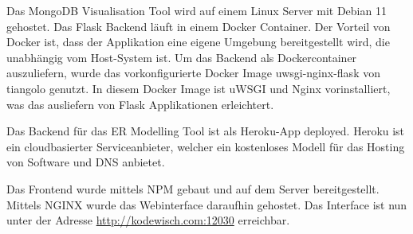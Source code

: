 \iffalse
Aufgabe des Kapitels Inbetriebnahme ist es, die Überführung der in 
Kapitel \ref{cha:implementierung} entwickelte Lösung in das betriebliche 
Umfeld aufzuzeigen. Dabei wird beispielsweise die Inbetriebnahme eines 
Programms beschrieben oder die Integration eines erstellten 
Programmodules dargestellt.

Bei der Software-Erstellung entspricht dieses Kapitel der 
Auslieferungsphase (Deployment) im \ac{rup}.
\fi

Das MongoDB Visualisation Tool wird auf einem Linux Server mit Debian 11 gehostet.
Das Flask Backend läuft in einem Docker Container.
Der Vorteil von Docker ist, dass der Applikation eine eigene Umgebung bereitgestellt wird, die unabhängig vom Host-System ist.
Um das Backend als Dockercontainer auszuliefern, wurde das vorkonfigurierte Docker Image uwsgi-nginx-flask von tiangolo genutzt.
In diesem Docker Image ist uWSGI und Nginx vorinstalliert, was das ausliefern von Flask Applikationen erleichtert.
~\autocite{tiangolo:uwsgi-nginx-flask}

Das Backend für das ER Modelling Tool ist als Heroku-App deployed.
Heroku ist ein cloudbasierter Serviceanbieter, welcher ein kostenloses Modell für das Hosting von Software und DNS anbietet.
~\autocite{heroku:heroku}

Das Frontend wurde mittels NPM gebaut und auf dem Server bereitgestellt.
Mittels NGINX wurde das Webinterface daraufhin gehostet. 
Das Interface ist nun unter der Adresse \url{http://kodewisch.com:12030} erreichbar.
